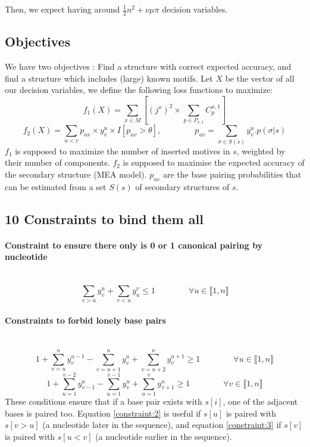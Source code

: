\documentclass{article}
\begin{document}
Then, we expect having around $\frac{1}{2}n^2+\nu \mu \pi$ decision variables.

\newpage
\subsection{Objectives}
We have two objectives : Find a structure with correct expected accuracy, and find a structure which includes (large) known motifs.
Let $X$ be the vector of all our decision variables, we define the following loss functions to maximize:
$$ f_1(X) = \sum_{x \in M} \left[ (j^x)^2 \times \sum_{p \in P_{x,1}} C^{x,1}_p \right]$$
$$ f_2(X) = \sum_{u<v} p_{uv}\times y^u_v \times I[p_{uv}>\theta], \qquad \qquad
p_{uv} = \sum_{\sigma \in S(s)} y^u_v.p(\sigma | s)$$
$f_1$ is supposed to maximize the number of inserted motives in $s$, weighted by their number of components.
$f_2$ is supposed to maximise the expected accuracy of the secondary structure (MEA model). 
$p_{uv}$ are the base pairing probabilities that can be estimated from a set $S(s)$ of secondary structures of $s$.

\subsection{10 Constraints to bind them all}
\paragraph{Constraint to ensure there only is 0 or 1 canonical pairing by nucleotide} ~ 
\begin{equation} \label{constraint:1}
	\sum_{v>u} y^u_v + \sum_{v<u} y^v_u \leq 1 \qquad\qquad \forall u \in \llbracket 1,n \rrbracket
\end{equation}
	
\paragraph{Constraints to forbid lonely base pairs} ~
\begin{equation} \label{constraint:2}
	1 + \sum_{v=u}^n y^{u-1}_v - \sum_{v=u+1}^n y^u_v + \sum_{v=u+2}^n y^{u+1}_v \geq 1 \qquad \qquad \forall u \in \llbracket 1,n\rrbracket
\end{equation}
\begin{equation} \label{constraint:3}
	1 + \sum_{u=1}^{v-2} y^u_{v-1} - \sum_{u=1}^{v-1} y^u_v + \sum_{u=1}^{v} y^u_{v+1} \geq 1 \qquad \qquad \forall v \in \llbracket 1,n\rrbracket
\end{equation}
These conditions ensure that if a base pair exists with $s[i]$, 
one of the adjacent bases is paired too. 
Equation \ref{constraint:2} is useful if $s[u]$ is paired with $s[v>u]$ (a nucleotide later in the sequence), 
and equation \ref{constraint:3} if $s[v]$ is paired with $s[u<v]$ (a nucleotide earlier in the sequence).
	
\end{document}

